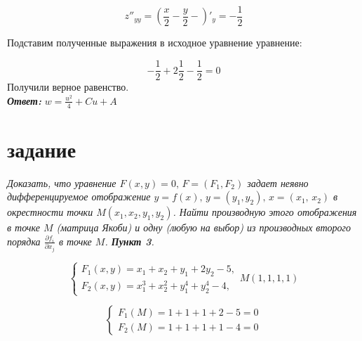 \documentclass[a5paper, 10pt]{article}
\theoremstyle{definition}
\theoremstyle{plain}
\theoremstyle{remark}
\begin{document}
\begin{equation}
z''_{yy} = \left(  \frac{x}{2} - \frac{y}{2} - \right)'_y =  - \frac{ 1}{2}
\end{equation}

Подставим полученные выражения в исходное уравнение уравнение:

\begin{equation}
- \frac{ 1}{2} + 2\frac{ 1}{2} - \frac{ 1}{2} = 0
\end{equation}
Получили верное равенство.\\

\textit{\textbf{Ответ:}} $ w =  \frac{u^2}{4} + Cu + A $


\newpage

\section{задание}
\textit{Доказать, что уравнение $F(x,y)=0, \, F=(F_1, F_2)$ задает неявно дифференцируемое отображение $y=f(x), \, y=(y_1, y_2), \, x = (x_1, \, x_2)$ в окрестности точки $M(x_1, x_2, y_1, y_2)$. Найти производную этого отображения в точке $M$ (матрица Якоби) и одну (любую на выбор) из производных второго порядка $\frac{\partial f_i}{\partial x_j}$ в точке $M$. \textbf{Пункт 3}.}

\begin{equation}
\begin{cases}
F_1 (x, y) = x_1 + x_2 + y_1 + 2y_2 -5,\\
F_2 (x, y) = x^3_1 + x^2_2 +y^4_1+y^4_2-4,
\end{cases}
M(1, 1, 1, 1)
\end{equation}



\begin{equation}
\begin{cases}
F_1(M) = 1 + 1 + 1 + 2 - 5 = 0\\
F_2(M) = 1 + 1 + 1 + 1 -4 = 0
\end{cases}
\end{equation}
\end{document}
